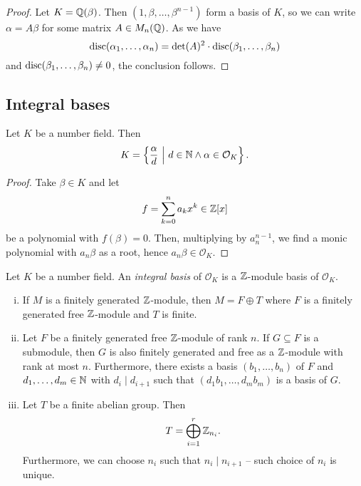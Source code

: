 \begin{proof}
Let $K = \mathbb{Q}(\beta)$. Then $(1, \beta, \dots, \beta^{n-1})$ form a
basis of $K$, so we can write $\alpha = A \beta$ for some matrix
$A \in M_n(\mathbb{Q})$. As we have
\[
\operatorname{disc}(\alpha_1, \dots, \alpha_n) =
\det(A)^2 \cdot \operatorname{disc}(\beta_1, \dots, \beta_n)
\]
and $\operatorname{disc}(\beta_1, \dots, \beta_n) \ne 0$, the conclusion follows.
\end{proof}

\newpage

\subsection{Integral bases}

\begin{trditev}
Let $K$ be a number field. Then
\[
K =
\left\{\frac{\alpha}{d}~\middle\vert~d \in \mathbb{N} \land \alpha \in \mathcal{O}_K\right\}.
\]
\end{trditev}

\begin{proof}
Take $\beta \in K$ and let
\[
f = \sum_{k=0}^n a_k x^k \in \mathbb{Z}[x]
\]
be a polynomial with $f(\beta) = 0$. Then, multiplying by
$a_n^{n-1}$, we find a monic polynomial with $a_n \beta$ as a root,
hence $a_n \beta \in \mathcal{O}_K$.
\end{proof}

\begin{definicija}
Let $K$ be a number field. An
\emph{integral basis} of $\mathcal{O}_K$ is
a $\mathbb{Z}$-module basis of $\mathcal{O}_K$.
\end{definicija}

\begin{izrek}[Structure]
\phantom{i}
\begin{enumerate}[i)]
\item If $M$ is a finitely generated $\mathbb{Z}$-module, then
$M = F \oplus T$ where $F$ is a finitely generated free $\mathbb{Z}$-module
and $T$ is finite.
\item Let $F$ be a finitely generated free $\mathbb{Z}$-module of rank $n$.
If $G \subseteq F$ is a submodule, then $G$ is also finitely
generated and free as a $\mathbb{Z}$-module with rank at most $n$.
Furthermore, there exists a basis $(b_1, \dots, b_n)$ of $F$ and
$d_1, \dots, d_m \in \mathbb{N}$ with $d_i \mid d_{i+1}$ such that
$(d_1 b_1, \dots, d_m b_m)$ is a basis of $G$.
\item Let $T$ be a finite abelian group. Then
\[
T = \bigoplus_{i=1}^r \mathbb{Z}_{n_i}.
\]
Furthermore, we can choose $n_i$ such that $n_i \mid n_{i+1}$ --
such choice of $n_i$ is unique.
\end{enumerate}
\end{izrek}

